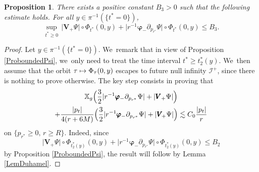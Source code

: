 \documentclass[JEP,XML,SOM,Unicode,published]{cedram}
\newcommand\mto{\mathchoice{\longmapsto}{\mapsto}{\mapsto}{\mapsto}}
\theoremstyle{plain}
\newtheorem{proposition}{Proposition}[section]
\theoremstyle{definition}
\newcommand\T{{\mathbb{X}}}
\begin{document}
\begin{proposition}\label{ProfinalPsideriv}
There exists a positive constant $B_3>0$ such that the following estimate holds. For all $y \in \pi^{-1}(\{t^* =0 \})$,
\[
\sup_{t^* \geq 0} \, \big| \pmb{V}_{\! +}\Psi \big|\circ \Phi_{t^*}(0,y)+\big|r^{-1} \pmb{\varphi}_- \partial_{p_{r^*}} \Psi \big|\circ \Phi_{t^*}(0,y) \leq B_3.
\]
\end{proposition}

\begin{proof}
Let $y \in \pi^{-1}(\{t^* =0 \})$. We~remark that in view of Proposition \ref{ProboundedPsi}, we~only need to treat the time interval $t^* \geq t_2^*(y)$. We~then assume that the orbit $\tau \mto \Phi_\tau(0,y)$ escapes to future null infinity $\mathcal{I}^+$, since there is nothing to prove otherwise. The key step consists in proving that
\begin{multline}\label{equation:toprove}
\T_g \Bigl(\frac{3}{2} | r^{-1} \pmb{\varphi}_- \partial_{p_{r^*}} \Psi|+| \pmb{V}_+ \Psi| \Bigr)\\
+ \frac{|p_t| }{4(r+6M)} \Bigl(\frac{3}{2} | r^{-1} \pmb{\varphi}_- \partial_{p_{r^*}} \Psi|+| \pmb{V}_{\! +} \Psi| \Bigr) \lesssim C_0\frac{|p_t|}{r }
\end{multline}
on $\{p_{r^*} \geq 0, \, r \geq R \}$. Indeed, since
\[
\big| \pmb{V}_{\! +}\Psi \big|\circ \Phi_{t^*_2(y)}(0,y)+\big|r^{-1} \pmb{\varphi}_- \partial_{p_{r^*}} \Psi \big|\circ \Phi_{t^*_2(y)}(0,y) \leq B_2
\]
by Proposition \ref{ProboundedPsi}, the result will follow by Lemma \ref{LemDuhamel}.


\end{proof}
\end{document}
